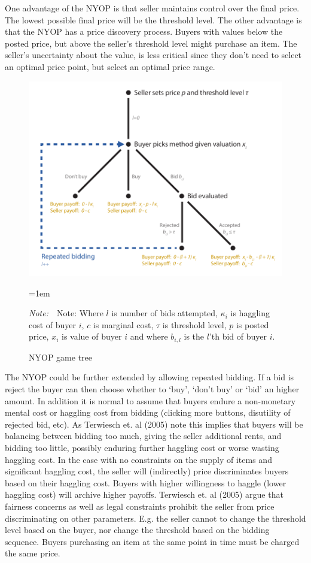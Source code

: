 \documentclass[a4paper,12pt]{article}
\newcommand{\Figtext}[1]{%
	\begin{tablenotes}[para,flushleft]
		\hangindent=1em
		\footnotesize
		\raggedright
		#1
	\end{tablenotes}
}
\newcommand{\Fignote}[1]{\Figtext{\emph{Note:~}~#1}}
\begin{document}
	One advantage of the NYOP is that seller maintains control over the final price. The lowest possible final price will be the threshold level. The other advantage is that the NYOP has a price discovery process. Buyers with values below the posted price, but above the seller's threshold level might purchase an item. The seller's uncertainty about the value, is less critical since they don't need to select an optimal price point, but select an optimal price range.

	\begin{figure}
	        \centering
	        \caption{NYOP game tree}
	        \includegraphics[width=\textwidth]{Figures/NYOP_GameTree}
			\label{fig:game_tree}
			\Fignote{Note: Where $l$ is number of bids attempted, $\kappa_i$ is haggling cost of buyer $i$, $c$ is marginal cost, $\tau$ is threshold level, $p$ is posted price, $x_i$ is value of buyer $i$ and where $b_{i,l}$ is the $l$'th bid of buyer $i$.}
	\end{figure}

	The NYOP could be further extended by allowing repeated bidding. If a bid is reject the buyer can then choose whether to `buy', `don't buy' or `bid' an higher amount. In addition it is normal to assume that buyers endure a non-monetary mental cost or haggling cost from bidding (clicking more buttons, disutility of rejected bid, etc). As Terwiesch et. al (2005) note this implies that buyers will be balancing between bidding too much, giving the seller additional rents, and bidding too little, possibly enduring further haggling cost or worse wasting haggling cost. In the case with no constraints on the supply of items and significant haggling cost, the seller will (indirectly) price discriminates buyers based on their haggling cost. Buyers with higher willingness to haggle (lower haggling cost) will archive higher payoffs. Terwiesch et. al (2005) argue that fairness concerns as well as legal constraints prohibit the seller from price discriminating on other parameters. E.g. the seller cannot to change the threshold level based on the buyer, nor change the threshold based on the bidding sequence. Buyers purchasing an item at the same point in time must be charged the same price.
\end{document}
